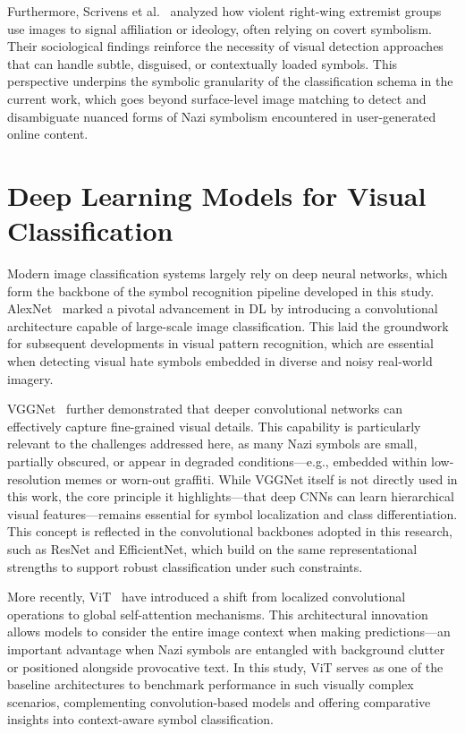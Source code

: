 Furthermore, Scrivens et al.~\parencite{scrivens2021dangerous} analyzed how violent right-wing extremist groups use
images to signal affiliation or ideology, often relying on covert symbolism. Their sociological findings reinforce
the necessity of visual detection approaches that can handle subtle, disguised, or contextually loaded symbols. This
perspective underpins the symbolic granularity of the classification schema in the current work, which goes
beyond surface-level image matching to detect and disambiguate nuanced forms of Nazi symbolism encountered in
user-generated online content.

\section{Deep Learning Models for Visual Classification}

Modern image classification systems largely rely on deep neural networks, which form the backbone of the symbol
recognition pipeline developed in this study. AlexNet~\parencite{krizhevsky2012imagenet} marked a pivotal
advancement in \ac{DL} by introducing a convolutional architecture capable of large-scale image classification. This
laid the groundwork for subsequent developments in visual pattern recognition, which are essential when detecting
visual hate symbols embedded in diverse and noisy real-world imagery.

VGGNet~\parencite{simonyan2014very} further demonstrated that deeper convolutional networks can effectively capture
fine-grained visual details. This capability is particularly relevant to the challenges addressed here, as many Nazi
symbols are small, partially obscured, or appear in degraded conditions—e.g., embedded within low-resolution memes
or worn-out graffiti. While VGGNet itself is not directly used in this work, the core principle it highlights—that
deep \ac{CNN}s can learn hierarchical visual features—remains essential for symbol localization and class
differentiation. This concept is reflected in the convolutional backbones adopted in this research, such as ResNet
and EfficientNet, which build on the same representational strengths to support robust classification under such
constraints.

More recently, \ac{ViT}~\parencite{dosovitskiy2020image} have introduced a shift from localized
convolutional operations to global self-attention mechanisms. This architectural innovation allows models to
consider the entire image context when making predictions—an important advantage when Nazi symbols are entangled
with background clutter or positioned alongside provocative text. In this study, ViT serves as one of the baseline
architectures to benchmark performance in such visually complex scenarios, complementing convolution-based models
and offering comparative insights into context-aware symbol classification.

